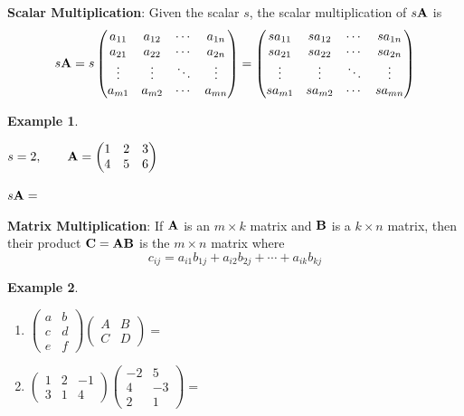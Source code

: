 \documentclass[
]{book}
\theoremstyle{definition}
\theoremstyle{definition}
\newtheorem{example}{Example}[chapter]
\theoremstyle{definition}
\theoremstyle{definition}
\theoremstyle{remark}
\begin{document}
\textbf{Scalar Multiplication}: Given the scalar \(s\), the scalar multiplication of \(s {\bf A}\) is
\[ s {\bf A}=  s \begin{pmatrix}
            a_{11} & a_{12} & \cdots & a_{1n} \\
            a_{21} & a_{22} & \cdots & a_{2n} \\
            \vdots & \vdots & \ddots & \vdots \\
            a_{m1} & a_{m2} & \cdots & a_{mn}
        \end{pmatrix}
        = \begin{pmatrix}
            s a_{11} & s a_{12} & \cdots & s a_{1n} \\
            s a_{21} & s a_{22} & \cdots & s a_{2n} \\
            \vdots & \vdots & \ddots & \vdots \\
            s a_{m1} & s a_{m2} & \cdots & s a_{mn}
        \end{pmatrix}\]

\begin{example}
\protect\hypertarget{exm:scalarmulti}{}{\label{exm:scalarmulti} }

\(s=2, \qquad {\bf A}=\begin{pmatrix} 1 & 2 & 3 \\ 4 & 5 & 6 \end{pmatrix}\)

\(s {\bf A} =\)
\end{example}

\textbf{Matrix Multiplication}: If \({\bf A}\) is an \(m\times k\) matrix and \(\bf B\) is a \(k\times n\) matrix, then their product \(\bf C = A B\) is the \(m\times n\) matrix where
\[c_{ij}=a_{i1}b_{1j}+a_{i2}b_{2j}+\cdots+a_{ik}b_{kj}\]

\begin{example}
\protect\hypertarget{exm:matrixmulti}{}{\label{exm:matrixmulti} }

\begin{enumerate}
\def\labelenumi{\arabic{enumi}.}
\item
  \(\begin{pmatrix} a&b\\c&d\\e&f \end{pmatrix} \begin{pmatrix} A&B\\C&D \end{pmatrix}  =\)
\item
  \(\begin{pmatrix} 1&2&-1\\3&1&4 \end{pmatrix} \begin{pmatrix} -2&5\\4&-3\\2&1\end{pmatrix} =\)
\end{enumerate}
\end{example}
\end{document}
